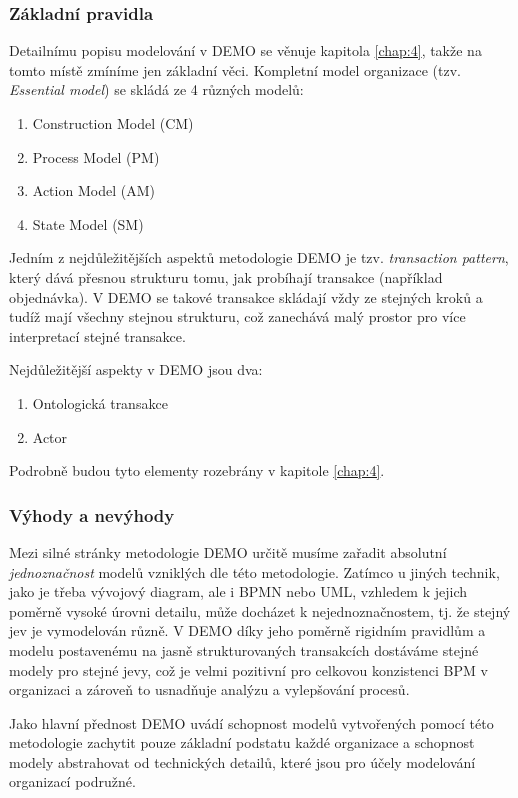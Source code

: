\subsubsection{Základní pravidla}
Detailnímu popisu modelování v DEMO se věnuje kapitola \ref{chap:4}, takže na tomto místě zmíníme jen základní věci. Kompletní model organizace (tzv. \textit{Essential model}) se skládá ze 4 různých modelů: \cite{Vejrazkova2012}

\begin{enumerate}
\item Construction Model (CM)
\item Process Model (PM)
\item Action Model (AM)
\item State Model (SM)
\end{enumerate}

Jedním z nejdůležitějších aspektů metodologie DEMO je tzv. \textit{transaction pattern}, který dává přesnou strukturu tomu, jak probíhají transakce (například objednávka). V DEMO se takové transakce skládají vždy ze stejných kroků a tudíž mají všechny stejnou strukturu, což zanechává malý prostor pro více interpretací stejné transakce.

Nejdůležitější aspekty v DEMO jsou dva:

\begin{enumerate}
\item Ontologická transakce
\item Actor
\end{enumerate}

Podrobně budou tyto elementy rozebrány v kapitole \ref{chap:4}.

\subsubsection{Výhody a nevýhody}
Mezi silné stránky metodologie DEMO určitě musíme zařadit absolutní \textit{jednoznačnost} modelů vzniklých dle této metodologie. Zatímco u jiných technik, jako je třeba vývojový diagram, ale i BPMN nebo UML, vzhledem k jejich poměrně vysoké úrovni detailu, může docházet k nejednoznačnostem, tj. že stejný jev je vymodelován různě. V DEMO díky jeho poměrně rigidním pravidlům a modelu postavenému na jasně strukturovaných transakcích dostáváme stejné modely pro stejné jevy, což je velmi pozitivní pro celkovou konzistenci BPM v organizaci a zároveň to usnadňuje analýzu a vylepšování procesů.

Jako hlavní přednost DEMO uvádí \cite{Barjis2011} schopnost modelů vytvořených pomocí této metodologie zachytit pouze základní podstatu každé organizace a schopnost modely abstrahovat od technických detailů, které jsou pro účely modelování organizací podružné.

